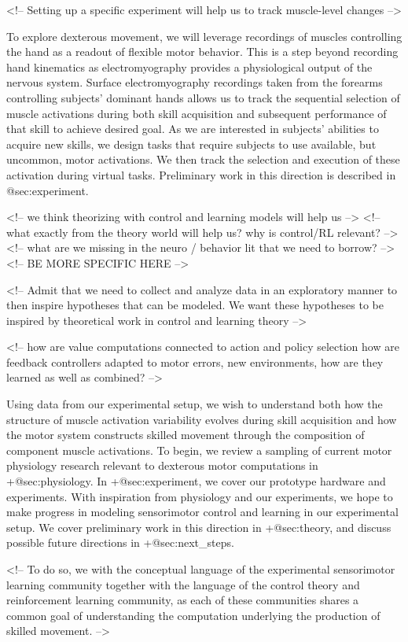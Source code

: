 \documentclass[../main.tex]{subfiles}
\begin{document}
<!-- Setting up a specific experiment will help us to track muscle-level changes -->

To explore dexterous movement, we will leverage recordings of muscles controlling the hand as a readout of flexible motor behavior. This is a step beyond recording hand kinematics as electromyography provides a physiological output of the nervous system. Surface electromyography recordings taken from the forearms controlling subjects' dominant hands allows us to track the sequential selection of muscle activations during both skill acquisition and subsequent performance of that skill to achieve desired goal. As we are interested in subjects' abilities to acquire new skills, we design tasks that require subjects to use available, but uncommon, motor activations. We then track the selection and execution of these activation during virtual tasks. Preliminary work in this direction is described in {@sec:experiment}.

<!-- we think theorizing with control and learning models will help us -->
<!-- what exactly from the theory world will help us? why is control/RL relevant? -->
<!-- what are we missing in the neuro / behavior lit that we need to borrow? -->
<!-- BE MORE SPECIFIC HERE -->

<!-- Admit that we need to collect and analyze data in an exploratory manner to then inspire hypotheses that can be modeled. We want these hypotheses to be inspired by theoretical work in control and learning theory -->

<!-- how are value computations connected to action and policy selection
how are feedback controllers adapted to motor errors, new environments, how are they learned as well as combined? -->

Using data from our experimental setup, we wish to understand both how the structure of muscle activation variability evolves during skill acquisition and how the motor system constructs skilled movement through the composition of component muscle activations. To begin, we review a sampling of current motor physiology research relevant to dexterous motor computations in {+@sec:physiology}. In {+@sec:experiment}, we cover our prototype hardware and experiments. With inspiration from physiology and our experiments, we hope to make progress in modeling sensorimotor control and learning in our experimental setup. We cover preliminary work in this direction in {+@sec:theory}, and discuss possible future directions in {+@sec:next_steps}.

<!-- To do so, we with the conceptual language of the experimental sensorimotor learning community together with the language of the control theory and reinforcement learning community, as each of these communities shares a common goal of understanding the computation underlying the production of skilled movement. -->
\end{document}

